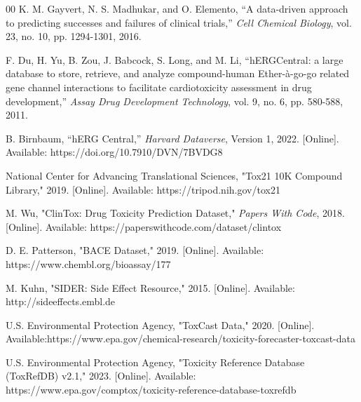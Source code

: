 \documentclass[conference]{IEEEtran}
\begin{document}
\begin{thebibliography}{00}
K. M. Gayvert, N. S. Madhukar, and O. Elemento, “A data-driven approach to predicting successes and failures of clinical trials,” \textit{Cell Chemical Biology}, vol. 23, no. 10, pp. 1294-1301, 2016.

F. Du, H. Yu, B. Zou, J. Babcock, S. Long, and M. Li, “hERGCentral: a large database to store, retrieve, and analyze compound-human Ether-à-go-go related gene channel interactions to facilitate cardiotoxicity assessment in drug development,” \textit{Assay Drug Development Technology}, vol. 9, no. 6, pp. 580-588, 2011.

B. Birnbaum, “hERG Central,” \textit{Harvard Dataverse}, Version 1, 2022. [Online]. Available: https://doi.org/10.7910/DVN/7BVDG8

National Center for Advancing Translational Sciences, "Tox21 10K Compound Library," 2019. [Online]. Available: https://tripod.nih.gov/tox21

M. Wu, "ClinTox: Drug Toxicity Prediction Dataset," \textit{Papers With Code}, 2018. [Online]. Available: https://paperswithcode.com/dataset/clintox

D. E. Patterson, "BACE Dataset," 2019. [Online]. Available: https://www.chembl.org/bioassay/177

M. Kuhn, "SIDER: Side Effect Resource," 2015. [Online]. Available: http://sideeffects.embl.de

U.S. Environmental Protection Agency, "ToxCast Data," 2020. [Online]. Available:https://www.epa.gov/chemical-research/toxicity-forecaster-toxcast-data

U.S. Environmental Protection Agency, "Toxicity Reference Database (ToxRefDB) v2.1," 2023. [Online]. Available: https://www.epa.gov/comptox/toxicity-reference-database-toxrefdb

\end{thebibliography}
\end{document}
